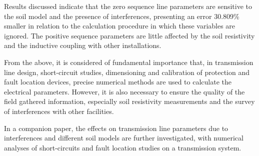 \documentclass[conference]{IEEEtran}
\begin{document}
Results discussed indicate that the zero sequence line parameters are sensitive to the soil model and the presence of interferences, presenting an error 30.809\% smaller in relation to the calculation procedure in which these variables are ignored. The positive sequence parameters are little affected by the soil resistivity and the inductive coupling with other installations.

From the above, it is considered of fundamental importance that, in transmission line design, short-circuit studies, dimensioning and calibration of protection and fault location devices, precise numerical methods are used to calculate the electrical parameters. However, it is also necessary to ensure the quality of the field gathered information, especially soil resistivity measurements and the survey of interferences with other facilities. 

In a companion paper, the effects on transmission line parameters due to interferences and different soil models are further investigated, with numerical analyses of short-circuits and fault location studies on a transmission system.  




\nocite{*}

\end{document}
